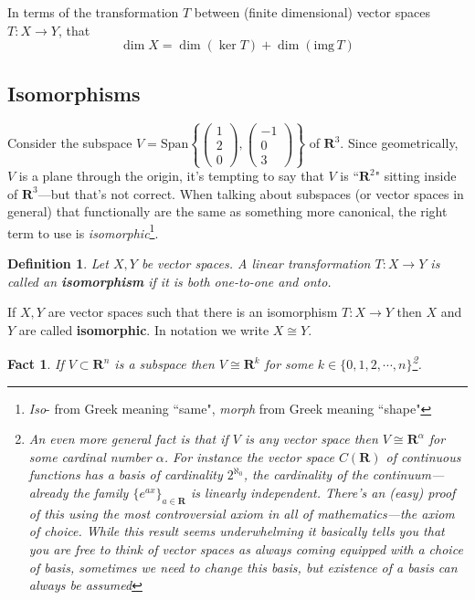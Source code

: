 \documentclass[12pt]{article}
\numberwithin{equation}{subsection}
\numberwithin{figure}{subsection}
\newtheorem{defn}[subsection]{Definition}
\newtheorem{fact}[subsection]{Fact}
\theoremstyle{note}
\newcommand{\img}{\mathrm{img\,}}
\newcommand\Span[1]{\mathrm{Span}\left\{#1\right\}}
\begin{document}
In terms of the transformation $T$ between (finite dimensional) vector spaces $T\colon X\to Y$, that \[ \dim X=\dim (\ker T)+\dim(\img T)\]


\subsection{Isomorphisms}
Consider the subspace $V=\Span{ \begin{pmatrix} 1 \\ 2 \\ 0 \end{pmatrix}, \begin{pmatrix} -1 \\ 0 \\ 3\end{pmatrix}}$ of $\mathbf{R}^3$. Since geometrically, $V$ is a plane through the origin, it's tempting to say that $V$ is ``$\mathbf{R}^2$" sitting inside of $\mathbf{R}^3$---but that's not correct. When talking about subspaces (or vector spaces in general) that functionally are the same as something more canonical, the right term to use is \textit{isomorphic}\footnote{\textit{Iso}- from Greek meaning ``same", \textit{morph} from Greek meaning ``shape"}. 

\begin{defn}Let $X,Y$ be vector spaces. A linear transformation $T\colon X\to Y$ is called an \textbf{isomorphism} if it is both one-to-one and onto. \end{defn}
If $X,Y$ are vector spaces such that there is an isomorphism $T\colon X\to Y$ then $X$ and $Y$ are called \textbf{isomorphic}. In notation we write $X\cong Y$. 

\begin{fact}
If $V\subset \mathbf{R}^n$ is a subspace then $V\cong \mathbf{R}^k$ for some $k\in \{0,1,2,\cdots,n\}$\footnote{An even more general fact is that if $V$ is \textit{any} vector space then $V\cong \mathbf{R}^{\alpha}$ for some cardinal number $\alpha$. For instance the vector space $C(\mathbf{R})$ of continuous functions has a basis of cardinality $2^{\aleph_0}$, the cardinality of the continuum---already the family $\{e^{ax}\}_{a\in\mathbf{R}}$ is linearly independent. There's an (easy) proof of this using the most controversial axiom in all of mathematics---\textit{the axiom of choice}. While this result seems underwhelming it basically tells you that you are free to think of vector spaces as always coming equipped with a choice of basis, sometimes we need to change this basis, but existence of a basis can always be assumed}.
\end{fact}
\end{document}
